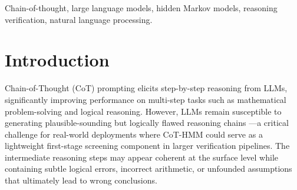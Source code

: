\documentclass[conference]{IEEEtran}
\begin{document}
\begin{abstract}
Chain-of-Thought (CoT) prompting elicits step-by-step reasoning from LLMs, yet verifying whether generated reasoning is structurally sound remains challenging. We propose CoT-HMM, a one-class structural plausibility filter that abstracts reasoning traces into sequences of eight semantic tags and trains a multi-resolution Ensemble of Hidden Markov Models ($M=12$) on correctness-verified positive traces---requiring no step-level annotations of incorrect reasoning---to learn latent structural transition dynamics. Operating at $\approx$150ms per sample on CPU, CoT-HMM targets a distinct niche from neural process reward models: structural anomaly detection rather than step-level semantic verification. Through controlled structural error injection on real LLM-generated traces (Qwen2.5-0.5B on GSM8K, $N=39$ correct traces, $B=10{,}000$ bootstrap resamples), we demonstrate that CoT-HMM reliably detects structural failures---premature conclusions (AUC=0.990 [$95\%$ CI: 0.966, 1.000]), circular reasoning loops (AUC=0.761 [$95\%$ CI: 0.645, 0.866]), and missing computation steps (AUC=0.658 [$95\%$ CI: 0.531, 0.778]). Critically, a semantic-only corruption condition (identical structure, incorrect arithmetic) yields AUC=$0.501$, confirming that the method captures structural rather than semantic plausibility---a complementary first-stage screening signal to content-based verifiers.
\end{abstract}

\begin{IEEEkeywords}
Chain-of-thought, large language models, hidden Markov models, reasoning verification, natural language processing.
\end{IEEEkeywords}

\section{Introduction}

Chain-of-Thought (CoT) prompting \cite{wei2022chain} elicits step-by-step reasoning from LLMs, significantly improving performance on multi-step tasks such as mathematical problem-solving and logical reasoning. However, LLMs remain susceptible to generating plausible-sounding but logically flawed reasoning chains \cite{ji2023survey}---a critical challenge for real-world deployments where CoT-HMM could serve as a lightweight first-stage screening component in larger verification pipelines. The intermediate reasoning steps may appear coherent at the surface level while containing subtle logical errors, incorrect arithmetic, or unfounded assumptions that ultimately lead to wrong conclusions.
\end{document}
